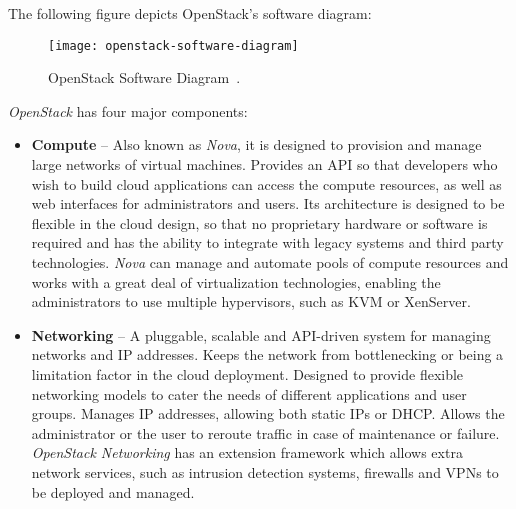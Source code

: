 The following figure depicts OpenStack's software diagram:

\begin{figure}[h]
  \begin{center}
    \leavevmode
    \texttt{[image: openstack-software-diagram]}
    \caption{OpenStack Software Diagram~\cite{openstack}.}
    \label{fig:openstack_sw_diag}
  \end{center}
\end{figure}

\textit{OpenStack} has four major components:

\begin{itemize}
\item \textbf{Compute} -- Also known as \textit{Nova}, it is designed to provision and manage large networks of virtual machines. Provides an API so that developers who wish to build cloud applications can access the compute resources, as well as web interfaces for administrators and users. Its architecture is designed to be flexible in the cloud design, so that no proprietary hardware or software is required and has the ability to integrate with legacy systems and third party technologies. \textit{Nova} can manage and automate pools of compute resources and works with a great deal of virtualization technologies, enabling the administrators to use multiple hypervisors, such as KVM or XenServer.
\item \textbf{Networking} -- A pluggable, scalable and API-driven system for managing networks and IP addresses. Keeps the network from bottlenecking or being a limitation factor in the cloud deployment. Designed to provide flexible networking models to cater the needs of different applications and user groups. Manages IP addresses, allowing both static IPs or DHCP. Allows the administrator or the user to reroute traffic in case of maintenance or failure. \textit{OpenStack Networking} has an extension framework which allows extra network services, such as intrusion detection systems, firewalls and VPNs to be deployed and managed.

\end{itemize}
